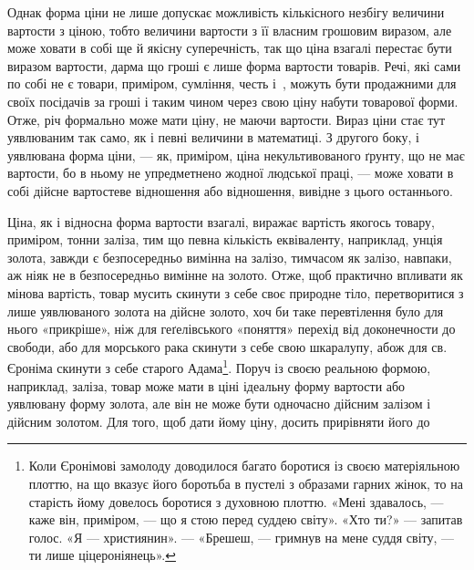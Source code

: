 Однак форма ціни не лише допускає можливість кількісного
незбігу величини вартости з ціною, тобто величини вартости
з її власним грошовим виразом, але може ховати в собі ще й
якісну суперечність, так що ціна взагалі перестає бути виразом
вартости, дарма що гроші є лише форма вартости товарів. Речі,
які сами по собі не є товари, приміром, сумління, честь і~,
можуть бути продажними для своїх посідачів за гроші і таким
чином через свою ціну набути товарової форми. Отже, річ формально
може мати ціну, не маючи вартости. Вираз ціни стає тут
уявлюваним так само, як і певні величини в математиці. З другого
боку, і уявлювана форма ціни, — як, приміром, ціна некультивованого
ґрунту, що не має вартости, бо в ньому не упредметнено
жодної людської праці, — може ховати в собі дійсне вартостеве
відношення або відношення, вивідне з цього останнього.

Ціна, як і відносна форма вартости взагалі, виражає вартість
якогось товару, приміром, тонни заліза, тим що певна кількість
еквіваленту, наприклад, унція золота, завжди є безпосередньо
вимінна на залізо, тимчасом як залізо, навпаки, аж ніяк не в
безпосередньо вимінне на золото. Отже, щоб практично впливати
як мінова вартість, товар мусить скинути з себе своє природне
тіло, перетворитися з лише уявлюваного золота на дійсне
золото, хоч би таке перевтілення було для нього «прикріше»,
ніж для геґелівського «поняття» перехід від доконечности до
свободи, або для морського рака скинути з себе свою шкаралупу,
абож для св. Єроніма скинути з себе старого Адама\footnote{
Коли Єронімові замолоду доводилося багато боротися із своєю
матеріяльною плоттю, на що вказує його боротьба в пустелі з образами
гарних жінок, то на старість йому довелось боротися з духовною плоттю.
«Мені здавалось, — каже він, приміром, — що я стою перед суддею світу».
«Хто ти?» — запитав голос. «Я — християнин». — «Брешеш, — гримнув
на мене суддя світу, — ти лише ціцероніянець».
}. Поруч
із своєю реальною формою, наприклад, заліза, товар може мати
в ціні ідеальну форму вартости або уявлювану форму золота,
але він не може бути одночасно дійсним залізом і дійсним золотом.
Для того, щоб дати йому ціну, досить прирівняти його до
\parbreak{}  %
